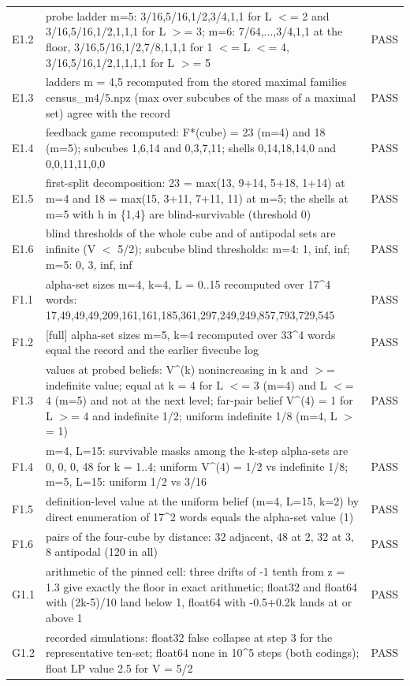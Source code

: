 \documentclass[11pt,a4paper]{article}
\theoremstyle{plain}
\theoremstyle{definition}
\theoremstyle{remark}
\begin{document}
{\begin{longtable}{@{}l p{} l@{}}
E1.2 & probe ladder m=5: 3/16,5/16,1/2,3/4,1,1 for L $<$= 2 and 3/16,5/16,1/2,1,1,1 for L $>$= 3; m=6: 7/64,...,3/4,1,1 at the floor, 3/16,5/16,1/2,7/8,1,1,1 for 1 $<$= L $<$= 4, 3/16,5/16,1/2,1,1,1,1 for L $>$= 5 & PASS\\
E1.3 & ladders m = 4,5 recomputed from the stored maximal families census\_m4/5.npz (max over subcubes of the mass of a maximal set) agree with the record & PASS\\
E1.4 & feedback game recomputed: F*(cube) = 23 (m=4) and 18 (m=5); subcubes 1,6,14 and 0,3,7,11; shells 0,14,18,14,0 and 0,0,11,11,0,0 & PASS\\
E1.5 & first-split decomposition: 23 = max(13, 9+14, 5+18, 1+14) at m=4 and 18 = max(15, 3+11, 7+11, 11) at m=5; the shells at m=5 with h in \{1,4\} are blind-survivable (threshold 0) & PASS\\
E1.6 & blind thresholds of the whole cube and of antipodal sets are infinite (V $<$ 5/2); subcube blind thresholds: m=4: 1, inf, inf; m=5: 0, 3, inf, inf & PASS\\
F1.1 & alpha-set sizes m=4, k=4, L = 0..15 recomputed over 17\^{}4 words: 17,49,49,49,209,161,161,185,361,297,249,249,857,793,729,545 & PASS\\
F1.2 & [full] alpha-set sizes m=5, k=4 recomputed over 33\^{}4 words equal the record and the earlier fivecube log & PASS\\
F1.3 & values at probed beliefs: V\^{}(k) nonincreasing in k and $>$= indefinite value; equal at k = 4 for L $<$= 3 (m=4) and L $<$= 4 (m=5) and not at the next level; far-pair belief V\^{}(4) = 1 for L $>$= 4 and indefinite 1/2; uniform indefinite 1/8 (m=4, L $>$= 1) & PASS\\
F1.4 & m=4, L=15: survivable masks among the k-step alpha-sets are 0, 0, 0, 48 for k = 1..4; uniform V\^{}(4) = 1/2 vs indefinite 1/8; m=5, L=15: uniform 1/2 vs 3/16 & PASS\\
F1.5 & definition-level value at the uniform belief (m=4, L=15, k=2) by direct enumeration of 17\^{}2 words equals the alpha-set value (1) & PASS\\
F1.6 & pairs of the four-cube by distance: 32 adjacent, 48 at 2, 32 at 3, 8 antipodal (120 in all) & PASS\\
G1.1 & arithmetic of the pinned cell: three drifts of -1 tenth from z = 1.3 give exactly the floor in exact arithmetic; float32 and float64 with (2k-5)/10 land below 1, float64 with -0.5+0.2k lands at or above 1 & PASS\\
G1.2 & recorded simulations: float32 false collapse at step 3 for the representative ten-set; float64 none in 10\^{}5 steps (both codings); float LP value 2.5 for V = 5/2 & PASS\\

\end{longtable}}
\end{document}
